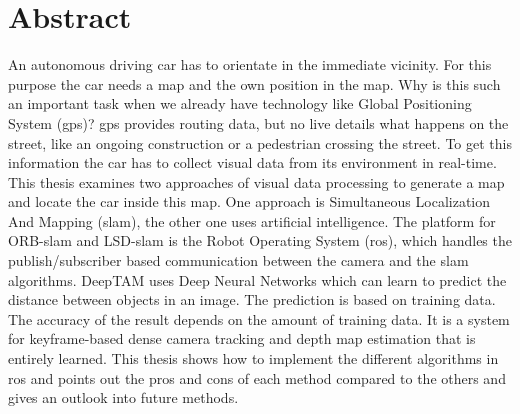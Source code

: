 

\chapter*{Abstract}
An autonomous driving car has to orientate in the immediate vicinity. For this purpose the car needs a map and the own position in the map. Why is this such an important task when we already have technology like Global Positioning System (\gls{gps})? \gls{gps} provides routing data, but no live details what happens on the street, like an ongoing construction or a pedestrian crossing the street. To get this information the car has to collect visual data from its environment in real-time. This thesis examines two approaches of visual data processing to generate a map and locate the car inside this map. One approach is Simultaneous Localization And Mapping  (\gls{slam}), the other one uses artificial intelligence. The platform for ORB-\gls{slam} and LSD-\gls{slam} is the Robot Operating System (\gls{ros}), which handles the publish/subscriber based communication between the camera and the \gls{slam} algorithms.\newline
DeepTAM uses Deep Neural Networks which can learn to predict the distance between objects in an image. The prediction is based on training data. The accuracy of the result depends on the amount of training data. It is a system for keyframe-based dense camera tracking and depth map estimation that is entirely learned. This thesis shows how to implement the different algorithms in \gls{ros} and points out the pros and cons of each method compared to the others and gives an outlook into future methods.
\newline
\newline
\newline
\newline
